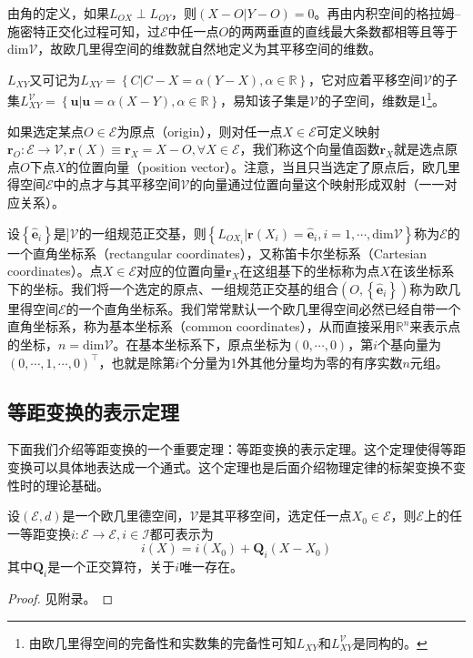 \documentclass[main.tex]{subfiles}
\begin{document}
由角的定义，如果$L_{OX}\perp L_{OY}$，则$\left(X-O|Y-O\right)=0$。再由内积空间的格拉姆--施密特正交化过程可知，过$\mathcal{E}$中任一点$O$的两两垂直的直线最大条数都相等且等于$\mathrm{dim}\mathcal{V}$，故欧几里得空间的维数就自然地定义为其平移空间的维数。

$L_{XY}$又可记为$L_{XY}=\left\{C|C-X=\alpha\left(Y-X\right),\alpha\in\mathbb{R}\right\}$，它对应着平移空间$\mathcal{V}$的子集$L^{\mathcal{V}}_{XY}=\left\{\mathbf{u}|\mathbf{u}=\alpha\left(X-Y\right),\alpha\in\mathbb{R}\right\}$，易知该子集是$\mathcal{V}$的子空间，维数是1\footnote{由欧几里得空间的完备性和实数集的完备性可知$L_{XY}$和$L^{\mathcal{V}}_{XY}$是同构的。}。

如果选定某点$O\in\mathcal{E}$为原点（origin），则对任一点$X\in\mathcal{E}$可定义映射$\mathbf{r}_O:\mathcal{E}\rightarrow\mathcal{V},\mathbf{r}\left(X\right)\equiv\mathbf{r}_X=X-O,\forall X\in\mathcal{E}$，我们称这个向量值函数$\mathbf{r}_X$就是选点原点$O$下点$X$的位置向量（position vector）。注意，当且只当选定了原点后，欧几里得空间$\mathcal{E}$中的点才与其平移空间$\mathcal{V}$的向量通过位置向量这个映射形成双射（一一对应关系）。

设$\left\{\mathbf{\hat{e}}_i\right\}$是$]\mathcal{V}$的一组规范正交基，则$\left\{L_{OX_i}|\mathbf{r}\left(X_i\right)=\mathbf{\hat{e}}_i,i=1,\cdots,\mathrm{dim}\mathcal{V}\right\}$称为$\mathcal{E}$的一个直角坐标系（rectangular coordinates），又称笛卡尔坐标系（Cartesian coordinates）。点$X\in\mathcal{E}$对应的位置向量$\mathbf{r}_X$在这组基下的坐标称为点$X$在该坐标系下的坐标。我们将一个选定的原点、一组规范正交基的组合$\left(O,\left\{\mathbf{\hat{e}}_i\right\}\right)$称为欧几里得空间$\mathcal{E}$的一个直角坐标系。我们常常默认一个欧几里得空间必然已经自带一个直角坐标系，称为基本坐标系（common coordinates），从而直接采用$\mathbb{R}^n$来表示点的坐标，$n=\mathrm{dim}\mathcal{V}$。在基本坐标系下，原点坐标为$\left(0,\cdots,0\right)$，第$i$个基向量为$\left(0,\cdots,1,\cdots,0\right)^\intercal$，也就是除第$i$个分量为1外其他分量均为零的有序实数$n$元组。

\subsection{等距变换的表示定理}
下面我们介绍等距变换的一个重要定理：等距变换的表示定理。这个定理使得等距变换可以具体地表达成一个通式。这个定理也是后面介绍物理定律的标架变换不变性时的理论基础。

\begin{theorem}[等距变换的表示定理]\label{thm:II.9.1}
设$\left(\mathcal{E},d\right)$是一个欧几里德空间，$\mathcal{V}$是其平移空间，选定任一点$X_0\in\mathcal{E}$，则$\mathcal{E}$上的任一等距变换$i:\mathcal{E}\rightarrow\mathcal{E},i\in\mathcal{I}$都可表示为
\[
i\left(X\right)=i\left(X_0\right)+\mathbf{Q}_i\left(X-X_0\right)
\]
其中$\mathbf{Q}_i$是一个正交算符，关于$i$唯一存在。
\end{theorem}
\begin{proof}
见附录。
\end{proof}
\end{document}
